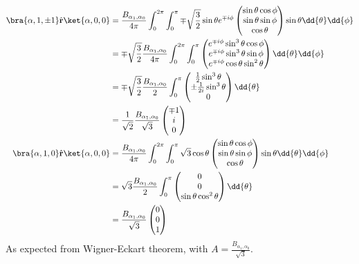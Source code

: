 \documentclass[12pt]{article}
\begin{document}
        \begin{align*}
            \bra{\alpha,1,\pm 1} \hat{\bf r} \ket{\alpha, 0,0} &=  \frac{B_{\alpha_1,\alpha_0}}{4\pi}  \int_0^{2\pi} \int_0^\pi \mp \sqrt{\frac{3}{2}} \sin\theta e^{ \mp i\phi}   \begin{pmatrix} \sin\theta\cos\phi\\ \sin\theta \sin\phi\\ \cos\theta \end{pmatrix} \sin\theta \dd{\theta}   \dd{\phi}  \\
            &=  \mp \sqrt{\frac{3}{2}} \frac{B_{\alpha_1,\alpha_0}}{4\pi}  \int_0^{2\pi} \int_0^\pi   \begin{pmatrix} e^{ \mp i\phi}\sin^3\theta\cos\phi\\ e^{ \mp i\phi}\sin^3\theta \sin\phi\\ e^{ \mp i\phi}\cos\theta \sin^2\theta \end{pmatrix} \dd{\theta}   \dd{\phi}  \\
            &=  \mp \sqrt{\frac{3}{2}} \frac{B_{\alpha_1,\alpha_0}}{2}  \int_0^\pi   \begin{pmatrix} \frac{1}{2}\sin^3\theta\\ \pm \frac{1}{2i}\sin^3\theta \\ 0\end{pmatrix} \dd{\theta}   \\
            &=  \frac{1}{\sqrt{2}}\frac{B_{\alpha_1,\alpha_0}}{\sqrt{3}}  \begin{pmatrix} \mp 1\\ i\\0 \end{pmatrix}\\ 
            \bra{\alpha,1,0} \hat{\bf r} \ket{\alpha, 0,0} &=  \frac{B_{\alpha_1,\alpha_0}}{4\pi}  \int_0^{2\pi} \int_0^\pi \sqrt{3} \cos\theta  \begin{pmatrix} \sin\theta\cos\phi\\ \sin\theta \sin\phi\\ \cos\theta \end{pmatrix} \sin\theta \dd{\theta}   \dd{\phi}  \\
            &=  \sqrt{3} \frac{B_{\alpha_1,\alpha_0}}{2}\int_0^\pi   \begin{pmatrix} 0 \\ 0\\ \sin\theta \cos^2\theta \end{pmatrix}  \dd{\theta}    \\
            &=  \frac{B_{\alpha_1,\alpha_0}}{\sqrt{3}}\begin{pmatrix} 0\\0\\ 1 \end{pmatrix} 
        \end{align*}
        As expected from Wigner-Eckart theorem, with \(A = \frac{B_{\alpha_1,\alpha_0}}{\sqrt{3}}\).
\end{document}
